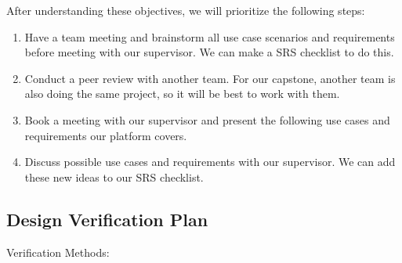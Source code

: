 \documentclass[12pt, titlepage]{article}
\begin{document}
After understanding these objectives, we will prioritize the following steps:
\begin{enumerate}
    \item Have a team meeting and brainstorm all use case scenarios and requirements before meeting with our supervisor. We can make a SRS checklist to do this.
    \item Conduct a peer review with another team. For our capstone, another team is also doing the same project, so it will be best to work with them.
    \item Book a meeting with our supervisor and present the following use cases and requirements our platform covers.
    \item Discuss possible use cases and requirements with our supervisor. We can add these new ideas to our SRS checklist.

\end{enumerate}

\subsection{Design Verification Plan}

Verification Methods:
\end{document}
